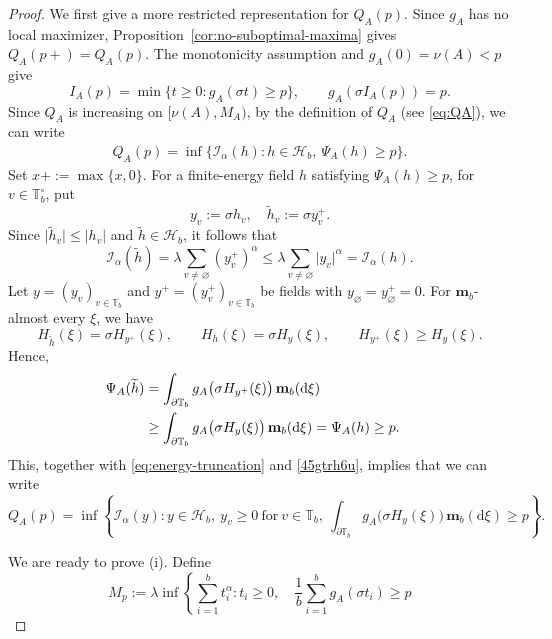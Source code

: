 \documentclass[a4paper, 11pt]{article}
\newcounter{assum}
\newcommand{\1}{\mathbf 1}
\theoremstyle{plain}
\begin{document}
\begin{proof}
We first give a more restricted representation for $Q_A(p)$. Since \(g_A\) has no local maximizer, Proposition~\ref{cor:no-suboptimal-maxima} gives $Q_A(p+)=Q_A(p).$ The monotonicity assumption and \(g_A(0)=\nu(A)<p\) give
\[
  I_A(p)=\min\{t\ge0:g_A(\sigma t)\ge p\},
  \qquad
  g_A(\sigma I_A(p))=p.
\]
Since $Q_A$ is increasing on $[\nu(A),M_A)$, by the definition of $Q_A$ (see \eqref{eq:QA}), we can write
\begin{align}\label{45gtrh6u}
  Q_A(p)=\inf\{\mathcal{I_{\alpha}}(h):h\in\mathcal{H}_b,\ \Psi_A(h)\ge p\}.
\end{align}
Set $x+:=\max\{x,0\}$. For a finite-energy field \(h\) satisfying \(\Psi_A(h)\ge p\), for ${v\in\mathbb{T}_b^{\circ}}$, put
\[
  y_v:=\sigma h_v,
  \quad
  \widetilde h_v:=\sigma y_v^+.
\]
Since \(\lvert\widetilde h_v\rvert\le\lvert h_v\rvert\) and
\(\widetilde h\in\mathcal{H}_b\), it follows that
\begin{equation}\label{eq:energy-truncation}
  \mathcal{I_{\alpha}}(\widetilde h)
  =\lambda\sum_{v\ne\varnothing}(y_v^+)^\alpha
  \le \lambda\sum_{v\ne\varnothing}\lvert y_v\rvert^\alpha
  =\mathcal{I_{\alpha}}(h).
\end{equation}
Let $y=(y_v)_{v\in\mathbb{T}_b}$ and $y^+=(y^+_v)_{v\in\mathbb{T}_b}$ be fields with $y_{\varnothing}=y^+_{\varnothing}=0$. For $\mathbf m_b$-almost every \(\xi\), we have
\[
  H_{\widetilde h}(\xi)=\sigma H_{y^+}(\xi),
  \qquad
  H_h(\xi)=\sigma H_y(\xi),
  \qquad
  H_{y^+}(\xi)\ge H_y(\xi).
\]
Hence,
\begin{align}
  \Psi_A(\widetilde h)
  &=\int_{\partial\mathbb{T}_b}g_A\bigl(\sigma H_{y^+}(\xi)\bigr)\,\mathbf m_b(\mathrm{d}\xi)\cr
  &\ge\int_{\partial\mathbb{T}_b}g_A\bigl(\sigma H_y(\xi)\bigr)\,\mathbf m_b(\mathrm{d}\xi)=\Psi_A(h)\ge p.\nonumber
\end{align}
This, together with \eqref{eq:energy-truncation} and \eqref{45gtrh6u}, implies that we can write
\begin{equation}\label{eq:positive-y}
 Q_A(p)=\inf\left\{\mathcal{I_{\alpha}}(y):y\in\mathcal{H}_b,~y_v\geq0\ \text{for}\ {v\in\mathbb{T}_b},\ \int_{\partial\mathbb{T}_b}g_A\bigl(\sigma H_{y}(\xi)\bigr)\,\mathbf m_b(\mathrm{d}\xi)\ge p\right\}.
\end{equation}
\par
 We are ready to prove (i). Define
\begin{equation}\label{eq:Mp}
  M_p:=\lambda\inf\left\{
      \sum_{i=1}^b t_i^\alpha:
      t_i\ge0,\quad
      \frac1b\sum_{i=1}^b g_A(\sigma t_i)\ge p

\end{equation}
\end{proof}
\end{document}
